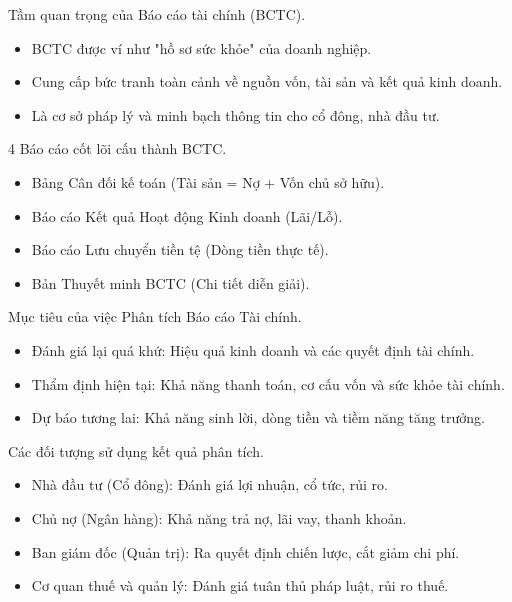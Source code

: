 \documentclass[aspectratio=169]{beamer}
\begin{document}
\begin{frame}{Tầm quan trọng của Báo cáo tài chính (BCTC).}
    \begin{itemize}
        \item BCTC được ví như "hồ sơ sức khỏe" của doanh nghiệp.
        \item Cung cấp bức tranh toàn cảnh về nguồn vốn, tài sản và kết quả kinh doanh.
        \item Là cơ sở pháp lý và minh bạch thông tin cho cổ đông, nhà đầu tư.
    \end{itemize}
\end{frame}


\begin{frame}{4 Báo cáo cốt lõi cấu thành BCTC.}
    \begin{itemize}
        \item Bảng Cân đối kế toán (Tài sản = Nợ + Vốn chủ sở hữu).
        \item Báo cáo Kết quả Hoạt động Kinh doanh (Lãi/Lỗ).
        \item Báo cáo Lưu chuyển tiền tệ (Dòng tiền thực tế).
        \item Bản Thuyết minh BCTC (Chi tiết diễn giải).
    \end{itemize}
\end{frame}


\begin{frame}{Mục tiêu của việc Phân tích Báo cáo Tài chính.}
    \begin{itemize}
        \item Đánh giá lại quá khứ: Hiệu quả kinh doanh và các quyết định tài chính.
        \item Thẩm định hiện tại: Khả năng thanh toán, cơ cấu vốn và sức khỏe tài chính.
        \item Dự báo tương lai: Khả năng sinh lời, dòng tiền và tiềm năng tăng trưởng.
    \end{itemize}
\end{frame}


\begin{frame}{Các đối tượng sử dụng kết quả phân tích.}
    \begin{itemize}
        \item Nhà đầu tư (Cổ đông): Đánh giá lợi nhuận, cổ tức, rủi ro.
        \item Chủ nợ (Ngân hàng): Khả năng trả nợ, lãi vay, thanh khoản.
        \item Ban giám đốc (Quản trị): Ra quyết định chiến lược, cắt giảm chi phí.
        \item Cơ quan thuế và quản lý: Đánh giá tuân thủ pháp luật, rủi ro thuế.
    \end{itemize}
\end{frame}
\end{document}
